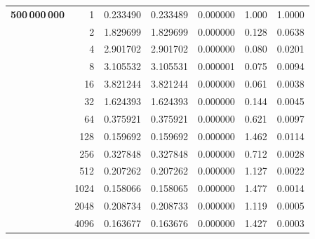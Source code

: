 \documentclass[a4paper,11pt]{article}
\begin{document}
\begin{center}
\begin{longtable}{crccccc}
    \textbf{500\,000\,000} 
    & 1    & 0.233490 & 0.233489 & 0.000000 & 1.000 & 1.0000 \\
    & 2    & 1.829699 & 1.829699 & 0.000000 & 0.128 & 0.0638 \\
    & 4    & 2.901702 & 2.901702 & 0.000000 & 0.080 & 0.0201 \\
    & 8    & 3.105532 & 3.105531 & 0.000001 & 0.075 & 0.0094 \\
    & 16   & 3.821244 & 3.821244 & 0.000000 & 0.061 & 0.0038 \\
    & 32   & 1.624393 & 1.624393 & 0.000000 & 0.144 & 0.0045 \\
    & 64   & 0.375921 & 0.375921 & 0.000000 & 0.621 & 0.0097 \\
    & 128  & 0.159692 & 0.159692 & 0.000000 & 1.462 & 0.0114 \\
    & 256  & 0.327848 & 0.327848 & 0.000000 & 0.712 & 0.0028 \\
    & 512  & 0.207262 & 0.207262 & 0.000000 & 1.127 & 0.0022 \\
    & 1024 & 0.158066 & 0.158065 & 0.000000 & 1.477 & 0.0014 \\
    & 2048 & 0.208734 & 0.208733 & 0.000000 & 1.119 & 0.0005 \\
    & 4096 & 0.163677 & 0.163676 & 0.000000 & 1.427 & 0.0003 \\
\end{longtable}
\end{center}
\end{document}

